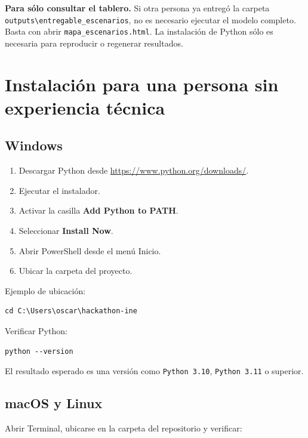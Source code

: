 \documentclass[11pt,a4paper]{article}
\newcommand{\ruta}[1]{\texttt{\small #1}}
\newcommand{\comando}[1]{\texttt{\small #1}}
\begin{document}
\begin{importante}
\textbf{Para sólo consultar el tablero.} Si otra persona ya entregó la carpeta \ruta{outputs\textbackslash entregable\_escenarios}, no es necesario ejecutar el modelo completo. Basta con abrir \ruta{mapa\_escenarios.html}. La instalación de Python sólo es necesaria para reproducir o regenerar resultados.
\end{importante}

\section{Instalación para una persona sin experiencia técnica}

\subsection{Windows}

\begin{enumerate}
    \item Descargar Python desde \url{https://www.python.org/downloads/}.
    \item Ejecutar el instalador.
    \item Activar la casilla \textbf{Add Python to PATH}.
    \item Seleccionar \textbf{Install Now}.
    \item Abrir PowerShell desde el menú Inicio.
    \item Ubicar la carpeta del proyecto.
\end{enumerate}

Ejemplo de ubicación:

\begin{lstlisting}[style=terminal]
cd C:\Users\oscar\hackathon-ine
\end{lstlisting}

Verificar Python:

\begin{lstlisting}[style=terminal]
python --version
\end{lstlisting}

El resultado esperado es una versión como \comando{Python 3.10}, \comando{Python 3.11} o superior.

\subsection{macOS y Linux}

Abrir Terminal, ubicarse en la carpeta del repositorio y verificar:
\end{document}
